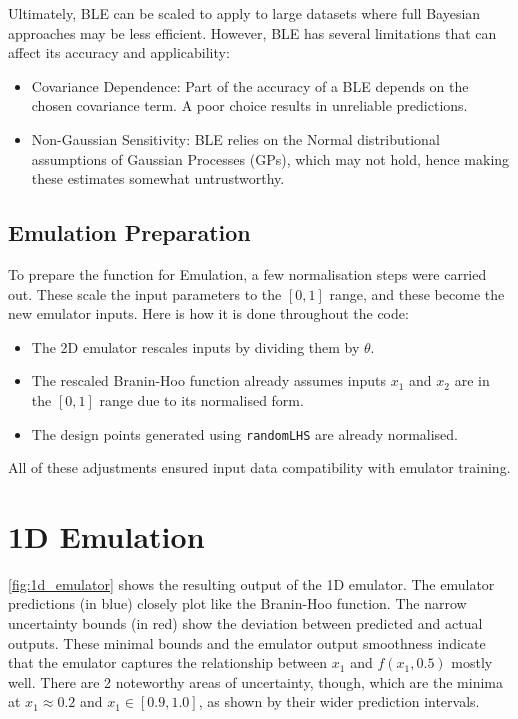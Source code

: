 \documentclass[12pt]{report} %
\begin{document}
\noindent Ultimately, BLE can be scaled to apply to large datasets where full Bayesian approaches may be less efficient. However, BLE has several limitations that can affect its accuracy and applicability:

\begin{itemize}
    \item Covariance Dependence: Part of the accuracy of a BLE depends on the chosen covariance term. A poor choice results in unreliable predictions.

    \item Non-Gaussian Sensitivity: BLE relies on the Normal distributional assumptions of Gaussian Processes (GPs), which may not hold, hence making these estimates somewhat untrustworthy.\cite{vernon2024}
\end{itemize}

\subsection{Emulation Preparation}
To prepare the function for Emulation, a few normalisation steps were carried out. These scale the input parameters to the $[0,1]$ range, and these become the new emulator inputs. Here is how it is done throughout the code:

\begin{itemize}
    \item The 2D emulator rescales inputs by dividing them by \( \theta \).
    \item The rescaled Branin-Hoo function already assumes inputs \( x_1 \) and \( x_2 \) are in the \([0, 1]\) range due to its normalised form.
    \item The design points generated using \texttt{randomLHS} are already normalised. 
\end{itemize}

\noindent All of these adjustments ensured input data compatibility with emulator training.

\section{1D Emulation}
\ref{fig:1d_emulator} shows the resulting output of the 1D emulator. The emulator predictions (in blue)
closely plot like the Branin-Hoo function. The narrow uncertainty bounds (in red) show the deviation between predicted and actual outputs. These minimal bounds and the emulator output smoothness indicate that the emulator captures the relationship between $x_1$ and $f(x_1, 0.5)$ mostly well. There are 2 noteworthy areas of uncertainty, though, which are the minima at $x_1 \approx 0.2$ and $x_1 \in [0.9,1.0]$, as shown by their wider prediction intervals.
\end{document}
